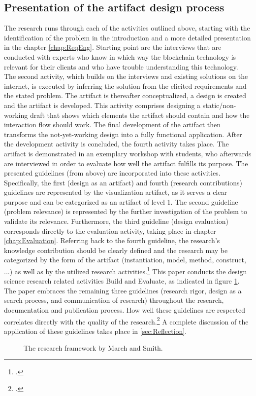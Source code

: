 \subsection{Presentation of the artifact design process}
The research runs through each of the activities outlined above, starting with the identification of the problem in the introduction and a more detailed presentation in the chapter \ref{chap:ReqEng}. Starting point are the interviews that are conducted with experts who know in which way the blockchain technology is relevant for their clients and who have trouble understanding this technology. The second activity, which builds on the interviews and existing solutions on the internet, is executed by inferring the solution from the elicited requirements and the stated problem. The artifact is thereafter conceptualized, a design is created and the artifact is developed. This activity comprises designing a static/non-working draft that shows which elements the artifact should contain and how the interaction flow should work. The final development of the artifact then transforms the not-yet-working design into a fully functional application. After the development activity is concluded, the fourth activity takes place. The artifact is demonstrated in an exemplary workshop with students, who afterwards are interviewed in order to evaluate how well the artifact fulfills its purpose. The presented guidelines (from above) are incorporated into these activities. Specifically, the first (design as an artifact) and fourth (research contributions) guidelines are represented by the visualization artifact, as it serves a clear purpose and can be categorized as an artifact of level 1. The second guideline (problem relevance) is represented by the further investigation of the problem to validate its relevance. Furthermore, the third guideline (design evaluation) corresponds directly to the evaluation activity, taking place in chapter \ref{chap:Evaluation}. Referring back to the fourth guideline, the research's knowledge contribution should be clearly defined and the research may be categorized by the form of the artifact (instantiation, model, method, construct, ...) as well as by the utilized research activities.\footcite[Cf.][p.255]{MarchDesignnaturalscience1995} This paper conducts the design science research related activities Build and Evaluate, as indicated in figure \ref{fig:researchFR}. The paper embraces the remaining three guidelines (research rigor, design as a search process, and communication of research) throughout the research, documentation and publication process. How well these guidelines are respected correlates directly with the quality of the research.\footcite[Cf.][p.19]{HevnerDesignResearchInformation2010} A complete discussion of the application of these guidelines takes place in \ref{sec:Reflection}.

\begin{figure}
    \centering
    
    \caption[The research framework by March and Smith.]{The research framework by March and Smith.\protect\footnotemark}
    \label{fig:researchFR}
\end{figure}
